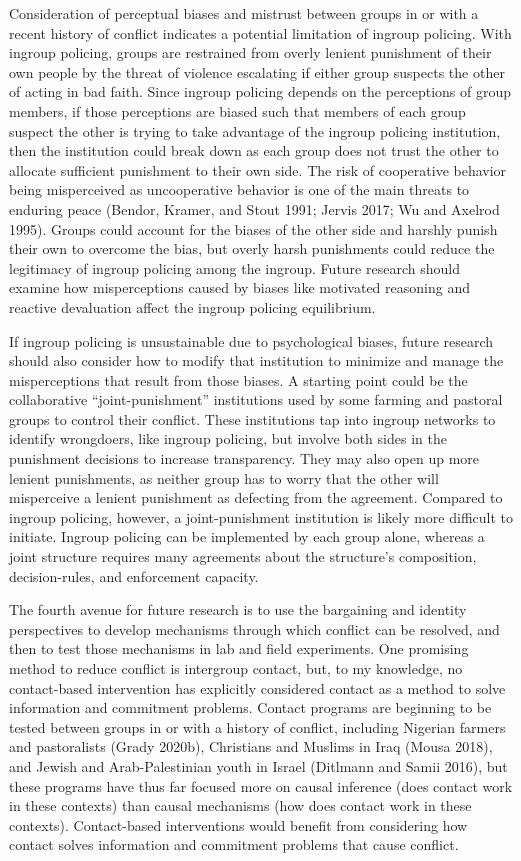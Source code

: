 \documentclass[11pt]{article}
\begin{document}
Consideration of perceptual biases and mistrust between groups in or
with a recent history of conflict indicates a potential limitation of
ingroup policing. With ingroup policing, groups are restrained from
overly lenient punishment of their own people by the threat of violence
escalating if either group suspects the other of acting in bad faith.
Since ingroup policing depends on the perceptions of group members, if
those perceptions are biased such that members of each group suspect the
other is trying to take advantage of the ingroup policing institution,
then the institution could break down as each group does not trust the
other to allocate sufficient punishment to their own side. The risk of
cooperative behavior being misperceived as uncooperative behavior is one
of the main threats to enduring peace (Bendor, Kramer, and Stout 1991;
Jervis 2017; Wu and Axelrod 1995). Groups could account for the biases
of the other side and harshly punish their own to overcome the bias, but
overly harsh punishments could reduce the legitimacy of ingroup policing
among the ingroup. Future research should examine how misperceptions
caused by biases like motivated reasoning and reactive devaluation
affect the ingroup policing equilibrium.

If ingroup policing is unsustainable due to psychological biases, future
research should also consider how to modify that institution to minimize
and manage the misperceptions that result from those biases. A starting
point could be the collaborative ``joint-punishment'' institutions used
by some farming and pastoral groups to control their conflict. These
institutions tap into ingroup networks to identify wrongdoers, like
ingroup policing, but involve both sides in the punishment decisions to
increase transparency. They may also open up more lenient punishments,
as neither group has to worry that the other will misperceive a lenient
punishment as defecting from the agreement. Compared to ingroup
policing, however, a joint-punishment institution is likely more
difficult to initiate. Ingroup policing can be implemented by each group
alone, whereas a joint structure requires many agreements about the
structure's composition, decision-rules, and enforcement capacity.

The fourth avenue for future research is to use the bargaining and
identity perspectives to develop mechanisms through which conflict can
be resolved, and then to test those mechanisms in lab and field
experiments. One promising method to reduce conflict is intergroup
contact, but, to my knowledge, no contact-based intervention has
explicitly considered contact as a method to solve information and
commitment problems. Contact programs are beginning to be tested between
groups in or with a history of conflict, including Nigerian farmers and
pastoralists (Grady 2020b), Christians and Muslims in Iraq (Mousa 2018),
and Jewish and Arab-Palestinian youth in Israel (Ditlmann and Samii
2016), but these programs have thus far focused more on causal inference
(does contact work in these contexts) than causal mechanisms (how does
contact work in these contexts). Contact-based interventions would
benefit from considering how contact solves information and commitment
problems that cause conflict.
\end{document}
